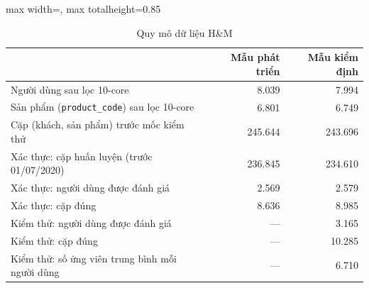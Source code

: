 \begin{table}[H]
    \centering\small
    \caption{Quy mô dữ liệu H\&M}
    \label{tab:v2data}
    \begin{adjustbox}{max width=\textwidth, max totalheight=0.85\textheight}
    \begin{tabular}{|l|r|r|}
        \hline
         & Mẫu phát triển & Mẫu kiểm định \\ \hline
        Người dùng sau lọc 10-core & 8.039 & 7.994 \\ \hline
        Sản phẩm (\texttt{product\_code}) sau lọc 10-core & 6.801 & 6.749 \\ \hline
        Cặp (khách, sản phẩm) trước mốc kiểm thử & 245.644 & 243.696 \\ \hline
        Xác thực: cặp huấn luyện (trước 01/07/2020) & 236.845 & 234.610 \\ \hline
        Xác thực: người dùng được đánh giá & 2.569 & 2.579 \\ \hline
        Xác thực: cặp đúng & 8.636 & 8.985 \\ \hline
        Kiểm thử: người dùng được đánh giá & --- & 3.165 \\ \hline
        Kiểm thử: cặp đúng & --- & 10.285 \\ \hline
        Kiểm thử: số ứng viên trung bình mỗi người dùng & --- & 6.710 \\ \hline
    \end{tabular}
    \end{adjustbox}
\end{table}
